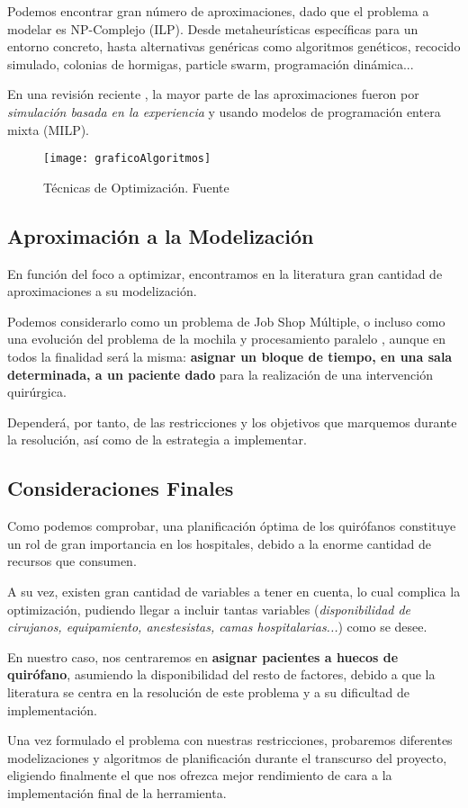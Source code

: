 Podemos encontrar gran número de aproximaciones, dado que el problema a modelar es NP-Complejo (ILP). Desde metaheurísticas específicas para un entorno concreto, hasta alternativas genéricas como algoritmos genéticos, recocido simulado, colonias de hormigas, particle swarm, programación dinámica... 

En una revisión reciente \cite{Gur2018ApplicationOverview}, la mayor parte de las aproximaciones fueron por \textit{simulación basada en la experiencia} y usando modelos de programación entera mixta (MILP).


\begin{figure}
    \centering
    \texttt{[image: graficoAlgoritmos]}
    \caption{Técnicas de Optimización. Fuente \cite{Gur2018ApplicationOverview}}
    \label{GraficoTecnicasOpt}
\end{figure}

\subsection{Aproximación a la Modelización}

En función del foco a optimizar, encontramos en la literatura gran cantidad de aproximaciones a su modelización.

Podemos considerarlo como un problema de Job Shop Múltiple, o incluso como una evolución del problema de la mochila y procesamiento paralelo \cite{Lin2020AScheduling}, aunque en todos la finalidad será la misma: \textbf{asignar un bloque de tiempo, en una sala determinada, a un paciente dado} para la realización de una intervención quirúrgica.

Dependerá, por tanto, de las restricciones y los objetivos que marquemos durante la resolución, así como de la estrategia a implementar.

\subsection{Consideraciones Finales}

Como podemos comprobar, una planificación óptima de los quirófanos constituye un rol de gran importancia en los hospitales, debido a la enorme cantidad de recursos que consumen. 

A su vez, existen gran cantidad de variables a tener en cuenta, lo cual complica \cite{Lin2020AScheduling} la optimización, pudiendo llegar a incluir tantas variables (\textit{disponibilidad de cirujanos, equipamiento, anestesistas, camas hospitalarias...}) como se desee.

En nuestro caso, nos centraremos en \textbf{asignar pacientes a huecos de quirófano}, asumiendo la disponibilidad del resto de factores, debido a que la literatura se centra en la resolución de este problema y a su dificultad de implementación.

Una vez formulado el problema con nuestras restricciones, probaremos diferentes modelizaciones y algoritmos de planificación durante el transcurso del proyecto, eligiendo finalmente el que nos ofrezca mejor rendimiento de cara a la implementación final de la herramienta.